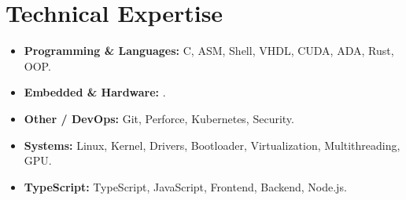 \documentclass[9pt,a4paper]{article}
\begin{document}
\section*{Technical Expertise}
\begin{tcolorbox}[mybox]
\begin{itemize}
\item \textbf{Programming \& Languages:} C, ASM, Shell, VHDL, CUDA, ADA, Rust, OOP.

\item \textbf{Embedded \& Hardware:} .

\item \textbf{Other / DevOps:} Git, Perforce, Kubernetes, Security.

\item \textbf{Systems:} Linux, Kernel, Drivers, Bootloader, Virtualization, Multithreading, GPU.

\item \textbf{TypeScript:} TypeScript, JavaScript, Frontend, Backend, Node.js.
\end{itemize}
\end{tcolorbox}
\end{document}
